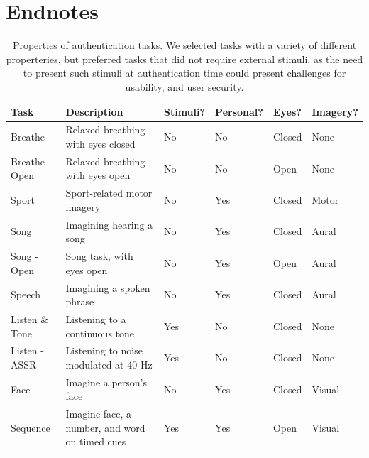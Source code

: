 \documentclass[letterpaper,twocolumn,10pt]{article}
\begin{document}
\section{Endnotes}

\begin{table}[h]
\centering
\begin{tabularx}{\textwidth}{llllll}
Task & Description & Stimuli? & Personal? & Eyes? & Imagery?\\
\hline
Breathe & Relaxed breathing with eyes closed & No & No & Closed & None\\
Breathe - Open & Relaxed breathing with eyes open & No & No & Open & None\\
Sport & Sport-related motor imagery & No & Yes & Closed & Motor\\
Song & Imagining hearing a song & No & Yes & Closed & Aural\\
Song - Open & Song task, with eyes open & No & Yes & Open & Aural\\
Speech & Imagining a spoken phrase & No & Yes & Closed & Aural\\
Listen \& Tone & Listening to a continuous tone & Yes & No & Closed & None\\
Listen - ASSR & Listening to noise modulated at 40 Hz & Yes & No & Closed & None\\
Face & Imagine a person's face & No & Yes & Closed & Visual\\
Sequence & Imagine face, a number, and word on timed cues & Yes & Yes & Open & Visual\\
\hline
\end{tabularx}
\caption{Properties of authentication tasks. We selected tasks with a variety of different properteries, but preferred tasks that did not require external stimuli, as the need to present such stimuli at authentication time could present challenges for usability, and user security.}
\label{tab:addlabel}%
\end{table}
\end{document}
